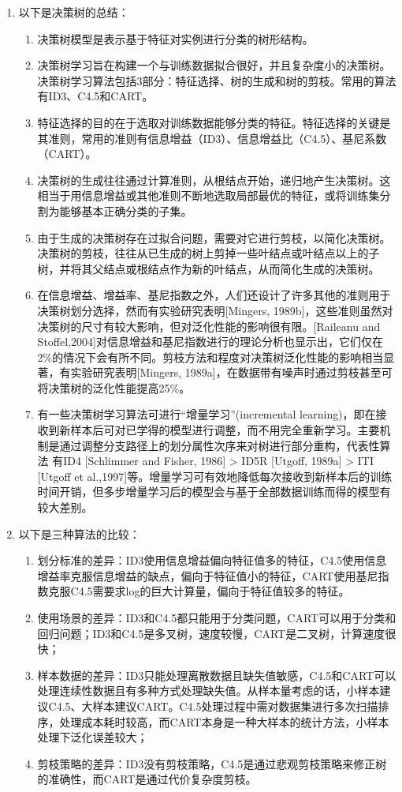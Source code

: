 \documentclass[fontset=windows]{article}
\begin{document}
\begin{enumerate}
\item 以下是决策树的总结：
      \begin{enumerate}
      \item 决策树模型是表示基于特征对实例进行分类的树形结构。
      \item 决策树学习旨在构建一个与训练数据拟合很好，并且复杂度小的决策树。决策树学习算法包括3部分：特征选择、树的生成和树的剪枝。常用的算法有ID3、C4.5和CART。
      \item 特征选择的目的在于选取对训练数据能够分类的特征。特征选择的关键是其准则，常用的准则有信息增益（ID3）、信息增益比（C4.5）、基尼系数（CART）。
      \item 决策树的生成往往通过计算准则，从根结点开始，递归地产生决策树。这相当于用信息增益或其他准则不断地选取局部最优的特征，或将训练集分割为能够基本正确分类的子集。
      \item 由于生成的决策树存在过拟合问题，需要对它进行剪枝，以简化决策树。决策树的剪枝，往往从已生成的树上剪掉一些叶结点或叶结点以上的子树，并将其父结点或根结点作为新的叶结点，从而简化生成的决策树。
      \item 在信息增益、增益率、基尼指数之外，人们还设计了许多其他的准则用于决策树划分选择，然而有实验研究表明[Mingers, 1989b]，这些准则虽然对决策树的尺寸有较大影响，但对泛化性能的影响很有限。[Raileanu and Stoffel,2004]对信息增益和基尼指数进行的理论分析也显示出，它们仅在2\%的情况下会有所不同。剪枝方法和程度对决策树泛化性能的影响相当显著，有实验研究表明[Mingers, 1989a]，在数据带有噪声时通过剪枝甚至可将决策树的泛化性能提高25\%。
      \item 有一些决策树学习算法可进行“增量学习”(incremental learning)，即在接收到新样本后可对已学得的模型进行调整，而不用完全重新学习。主要机制是通过调整分支路径上的划分属性次序来对树进行部分重构，代表性算法
      有ID4 [Schlimmer and Fisher, 1986] > ID5R [Utgoff, 1989a] > ITI [Utgoff et al.,1997]等。增量学习可有效地降低每次接收到新样本后的训练时间开销，但多步增量学习后的模型会与基于全部数据训练而得的模型有较大差别。
      \end{enumerate}
\item 以下是三种算法的比较：
      \begin{enumerate}
      \item 划分标准的差异：ID3使用信息增益偏向特征值多的特征，C4.5使用信息增益率克服信息增益的缺点，偏向于特征值小的特征，CART使用基尼指数克服C4.5需要求log的巨大计算量，偏向于特征值较多的特征。
      \item 使用场景的差异：ID3和C4.5都只能用于分类问题，CART可以用于分类和回归问题；ID3和C4.5是多叉树，速度较慢，CART是二叉树，计算速度很快；
      \item 样本数据的差异：ID3只能处理离散数据且缺失值敏感，C4.5和CART可以处理连续性数据且有多种方式处理缺失值。从样本量考虑的话，小样本建议C4.5、大样本建议CART。C4.5处理过程中需对数据集进行多次扫描排序，处理成本耗时较高，而CART本身是一种大样本的统计方法，小样本处理下泛化误差较大；
      \item 剪枝策略的差异：ID3没有剪枝策略，C4.5是通过悲观剪枝策略来修正树的准确性，而CART是通过代价复杂度剪枝。
      \end{enumerate}
\end{enumerate}
\end{document}
